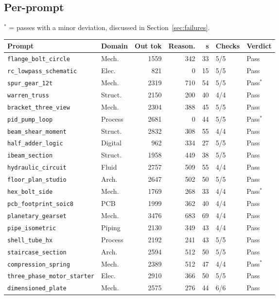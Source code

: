 \documentclass[11pt,a4paper]{article}
\begin{document}
\subsection{Per-prompt}
$^{*}$ = passes with a minor deviation, discussed in Section~\ref{sec:failures}.
\begin{longtable}{llrrrll}
\toprule
Prompt & Domain & Out tok & Reason. & s & Checks & Verdict \\
\midrule
\endhead
\texttt{flange\_bolt\_circle} & Mech. & 1559 & 342 & 33 & 5/5 & Pass \\
\texttt{rc\_lowpass\_schematic} & Elec. & 821 & 0 & 15 & 5/5 & Pass \\
\texttt{spur\_gear\_12t} & Mech. & 2319 & 710 & 54 & 5/5 & Pass$^{*}$ \\
\texttt{warren\_truss} & Struct. & 2150 & 200 & 40 & 4/4 & Pass \\
\texttt{bracket\_three\_view} & Mech. & 2304 & 388 & 45 & 5/5 & Pass \\
\texttt{pid\_pump\_loop} & Process & 2681 & 0 & 44 & 5/5 & Pass$^{*}$ \\
\texttt{beam\_shear\_moment} & Struct. & 2832 & 308 & 55 & 4/4 & Pass \\
\texttt{half\_adder\_logic} & Digital & 962 & 334 & 27 & 5/5 & Pass \\
\texttt{ibeam\_section} & Struct. & 1958 & 449 & 38 & 5/5 & Pass \\
\texttt{hydraulic\_circuit} & Fluid & 2757 & 509 & 55 & 4/4 & Pass \\
\texttt{floor\_plan\_studio} & Arch. & 2647 & 502 & 50 & 5/5 & Pass \\
\texttt{hex\_bolt\_side} & Mech. & 1769 & 268 & 33 & 4/4 & Pass$^{*}$ \\
\texttt{pcb\_footprint\_soic8} & PCB & 1999 & 362 & 40 & 4/4 & Pass \\
\texttt{planetary\_gearset} & Mech. & 3476 & 683 & 69 & 4/4 & Pass \\
\texttt{pipe\_isometric} & Piping & 2130 & 349 & 43 & 4/4 & Pass \\
\texttt{shell\_tube\_hx} & Process & 2192 & 241 & 43 & 5/5 & Pass \\
\texttt{staircase\_section} & Arch. & 2594 & 512 & 50 & 5/5 & Pass \\
\texttt{compression\_spring} & Mech. & 2389 & 512 & 47 & 4/4 & Pass$^{*}$ \\
\texttt{three\_phase\_motor\_starter} & Elec. & 2910 & 366 & 50 & 5/5 & Pass \\
\texttt{dimensioned\_plate} & Mech. & 2575 & 276 & 44 & 6/6 & Pass \\
\bottomrule
\end{longtable}
\end{document}
